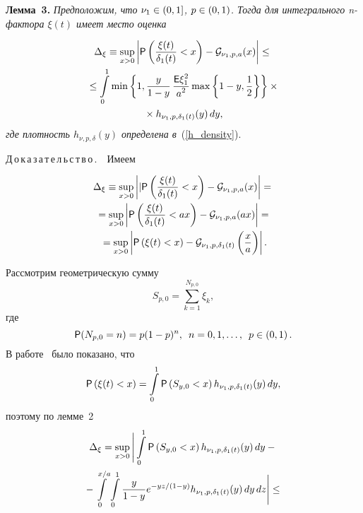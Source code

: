 \begin{multicols}{2}
\smallskip

\noindent
\textbf{Лемма~3.}
\textit{Предположим, что $\nu_1\hm\in(0,1]$, $p\hm\in(0,1)$.
Тогда для интегрального n-фак\-то\-ра $\xi(t)$ имеет место оценка}

\vspace*{-4pt}

\noindent
\begin{multline*}
\Delta_\xi\equiv\sup\limits_{x>0}\left|{\sf P}\left( \displaystyle\frac{\displaystyle \xi(t)\mathstrut}{\displaystyle \delta_1 (t)\mathstrut}< x\right)-
{\cal G}_{\nu_1,p,a}(x)\right|\le{}
\\
{}
\le
\int\limits_0^1
\min\left\{1,
\displaystyle\frac{\displaystyle y\mathstrut}{\displaystyle 1-y\mathstrut}\,\displaystyle\frac{\displaystyle {\sf E} \xi_1^2\mathstrut}{\displaystyle a^2\mathstrut}\max\left\{1-y,\displaystyle\frac{\displaystyle 1\mathstrut}{\displaystyle 2\mathstrut}\right\}
\right\}\times{}\\
{}\times
h_{\nu_1,p,\delta_1 (t)}(y)\,dy,
\end{multline*}
\textit{где плотность $h_{\nu,p,\delta}(y)$ определена в}~(\ref{h_density}).


\smallskip

\noindent
Д\,о\,к\,а\,з\,а\,т\,е\,л\,ь\,с\,т\,в\,о\,.\ \ 
Имеем

\vspace*{-4pt}

\noindent
\begin{multline*}
\Delta_\xi\equiv\sup\limits_{x>0}\left|\vert
{\sf P}\left( \displaystyle\frac{\displaystyle \xi(t)\mathstrut}{\displaystyle \delta_1 (t)\mathstrut}< x\right)-
{\cal G}_{\nu_1,p,a}(x)\right|={}
\\
{}=\sup\limits_{x>0}\left|{\sf P}\left( \displaystyle\frac{\displaystyle \xi(t)\mathstrut}{\displaystyle \delta_1 (t)\mathstrut}< ax\right)-{\cal  G}_{\nu_1,p,a}(ax)\right|={}
\\
{}=\sup\limits_{x>0}\left|{\sf P}\left(\xi(t)<x\right)-
{\cal G}_{\nu_1,p,\delta_1 (t)}\left(\displaystyle\frac{\displaystyle x\mathstrut}{\displaystyle a\mathstrut}\right)\right|.
\end{multline*}

Рассмотрим геометрическую сумму
$$
S_{p,0}=\sum\limits_{k=1}^{N_{p,0}}\xi_k,
$$
где
$$
{\sf P} (N_{p,0}=n)=p(1-p)^{n},\enskip n=0,1,\ldots, \enskip p\in(0,1)\,.
$$
В работе~\cite{KuShe2023_math_zeta} было показано, что
$$
{\sf P}\left(\xi(t)<x\right)=
\int\limits_0^1 {\sf P}\left(S_{y,0}<x\right)h_{\nu_1,p,\delta_1 (t)}(y)\,dy,
$$
поэтому по  лемме~2
\begin{multline*}
\Delta_\xi=
\sup\limits_{x>0}\Bigg\vert
\int\limits_0^1 {\sf P}\left(S_{y,0}<x\right)h_{\nu_1,p,\delta_1 (t)}(y)\,dy-{}\\
{}-
\int\limits_0^{x/a}
\int\limits_0^1\displaystyle\frac{\displaystyle y\mathstrut}{\displaystyle 1-y\mathstrut}e^{-{yz}/({1-y})}  h_{\nu_1,p,\delta_1 (t)}(y)\,dy
\,dz
\Bigg\vert\le{}
\end{multline*}


\end{multicols}
